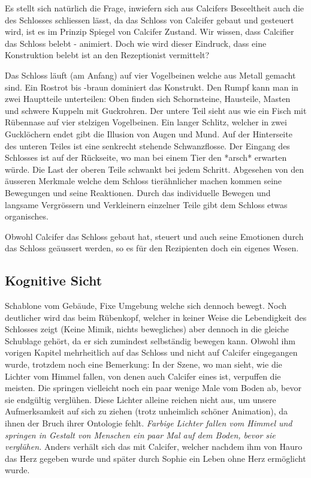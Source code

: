 Es stellt sich natürlich die Frage, inwiefern sich aus Calcifers Beseeltheit auch die des Schlosses schliessen lässt, da das Schloss von Calcifer gebaut und gesteuert wird, ist es im Prinzip Spiegel von Calcifer Zustand. Wir wissen, dass Calcifier das Schloss belebt - animiert. Doch wie wird dieser Eindruck, dass eine Konstruktion belebt ist an den Rezeptionist vermittelt?

Das Schloss läuft (am Anfang) auf vier Vogelbeinen welche aus Metall gemacht sind. Ein Rostrot bis -braun dominiert das Konstrukt. Den Rumpf kann man in zwei Hauptteile unterteilen: Oben finden sich Schornsteine, Hausteile, Masten und schwere Kuppeln mit Guckrohren. Der untere Teil sieht aus wie ein Fisch mit Rübennase auf vier stelzigen Vogelbeinen. Ein langer Schlitz, welcher in zwei Gucklöchern endet gibt die Illusion von Augen und Mund. Auf der Hinterseite des unteren Teiles ist eine senkrecht stehende Schwanzflosse. Der Eingang des Schlosses ist auf der Rückseite, wo man bei einem Tier den *arsch* erwarten würde. Die Last der oberen Teile schwankt bei jedem Schritt.
Abgesehen von den äusseren Merkmale welche dem Schloss tierähnlicher machen kommen seine Bewegungen und seine Reaktionen. Durch das individuelle Bewegen und langsame Vergrössern und Verkleinern einzelner Teile gibt dem Schloss etwas organisches. 

Obwohl Calcifer das Schloss gebaut hat, steuert und auch seine Emotionen durch das Schloss geäussert werden, so es für den Rezipienten doch ein eigenes Wesen.

\subsection{Kognitive Sicht}
Schablone vom Gebäude, Fixe Umgebung welche sich dennoch bewegt. Noch deutlicher wird das beim Rübenkopf, welcher in keiner Weise die Lebendigkeit des Schlosses zeigt (Keine Mimik, nichts bewegliches) aber dennoch in die gleiche Schublage gehört, da er sich zumindest selbständig bewegen kann.
Obwohl ihm vorigen Kapitel mehrheitlich auf das Schloss und nicht auf Calcifer eingegangen wurde, trotzdem noch eine Bemerkung: In der Szene, wo man sieht, wie die Lichter vom Himmel fallen, von denen auch Calcifer eines ist, verpuffen die meisten. Die springen vielleicht noch ein paar wenige Male vom Boden ab, bevor sie endgültig verglühen. Diese Lichter alleine reichen nicht aus, um unsere Aufmerksamkeit auf sich zu ziehen (trotz unheimlich schöner Animation), da ihnen der Bruch ihrer Ontologie fehlt. \emph{Farbige Lichter fallen vom Himmel und springen in Gestalt von Menschen ein paar Mal auf dem Boden, bevor sie verglühen.} Anders verhält sich das mit Calcifer, welcher nachdem ihm von Hauro das Herz gegeben wurde und später durch Sophie ein Leben ohne Herz ermöglicht wurde.